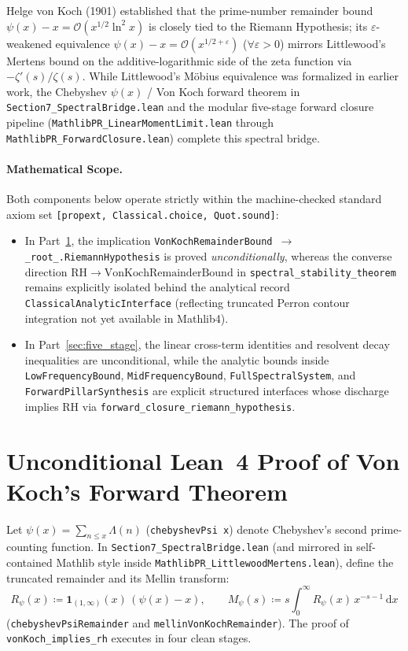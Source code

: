 \documentclass[11pt,a4paper]{article}
\theoremstyle{definition}
\newcommand{\dee}{\mathrm{d}}
\begin{document}
Helge von Koch (1901) established that the prime-number remainder bound $\psi(x) - x = \mathcal{O}(x^{1/2}\ln^2 x)$ is closely tied to the Riemann Hypothesis; its $\varepsilon$-weakened equivalence $\psi(x) - x = \mathcal{O}(x^{1/2+\varepsilon})$ ($\forall \varepsilon > 0$) mirrors Littlewood's Mertens bound on the additive-logarithmic side of the zeta function via $-\zeta'(s)/\zeta(s)$. While Littlewood's M\"obius equivalence was formalized in earlier work, the Chebyshev $\psi(x)$ / Von Koch forward theorem in \texttt{Section7\_\allowbreak SpectralBridge.lean} and the modular five-stage forward closure pipeline (\texttt{MathlibPR\_\allowbreak LinearMomentLimit.lean} through \texttt{MathlibPR\_\allowbreak ForwardClosure.lean}) complete this spectral bridge.

\paragraph{Mathematical Scope.}
Both components below operate strictly within the machine-checked standard axiom set \texttt{[propext, Classical.choice, Quot.sound]}:
\begin{itemize}[noitemsep]
  \item In Part~\ref{sec:vonkoch}, the implication \texttt{VonKochRemainderBound $\to$ \_root\_.\allowbreak RiemannHypothesis} is proved \emph{unconditionally}, whereas the converse direction $\mathrm{RH} \to \mathrm{VonKochRemainderBound}$ in \texttt{spectral\_\allowbreak stability\_\allowbreak theorem} remains explicitly isolated behind the analytical record \texttt{ClassicalAnalyticInterface} (reflecting truncated Perron contour integration not yet available in Mathlib4).
  \item In Part~\ref{sec:five_stage}, the linear cross-term identities and resolvent decay inequalities are unconditional, while the analytic bounds inside \texttt{LowFrequencyBound}, \texttt{MidFrequencyBound}, \texttt{FullSpectralSystem}, and \texttt{ForwardPillarSynthesis} are explicit structured interfaces whose discharge implies RH via \texttt{forward\_\allowbreak closure\_\allowbreak riemann\_\allowbreak hypothesis}.
\end{itemize}

\section{Unconditional Lean~4 Proof of Von Koch's Forward Theorem}\label{sec:vonkoch}

Let $\psi(x) = \sum_{n \le x} \Lambda(n)$ (\texttt{chebyshevPsi x}) denote Chebyshev's second prime-counting function. In \texttt{Section7\_\allowbreak SpectralBridge.lean} (and mirrored in self-contained Mathlib style inside \texttt{MathlibPR\_\allowbreak LittlewoodMertens.lean}), define the truncated remainder and its Mellin transform:
\begin{equation}
R_\psi(x) \coloneqq \mathbf{1}_{(1,\infty)}(x)\,(\psi(x) - x), \qquad
M_\psi(s) \coloneqq s \int_0^\infty R_\psi(x)\, x^{-s-1}\,\dee x
\end{equation}
(\texttt{chebyshevPsiRemainder} and \texttt{mellinVonKochRemainder}). The proof of \texttt{vonKoch\_\allowbreak implies\_\allowbreak rh} executes in four clean stages.
\end{document}
